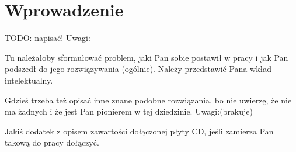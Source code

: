 
\chapter*{Wprowadzenie}

TODO: napisać!
\newline
Uwagi: 

Tu należałoby sformułować problem, jaki Pan sobie postawił w pracy i jak Pan podszedł do jego rozwiązywania (ogólnie). Należy przedstawić Pana wkład intelektualny.

Gdzieś trzeba też opisać inne znane podobne rozwiązania, bo nie uwierzę, że nie ma żadnych i że jest Pan pionierem w tej dziedzinie.
\newline
Uwagi:(brakuje)

Jakiś dodatek z opisem zawartości dołączonej płyty CD, jeśli zamierza Pan takową do pracy dołączyć.
   